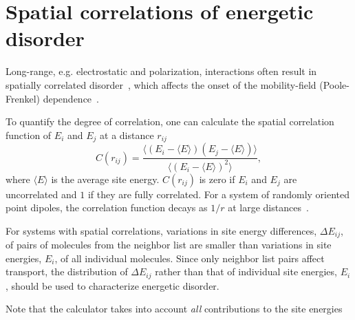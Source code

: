 \section{Spatial correlations of energetic disorder}
\label{sec:eanalyze}

Long-range, e.g. electrostatic and polarization, interactions often result in spatially correlated disorder~\cite{dunlap_charge-dipole_1996}, which affects the onset of the mobility-field (Poole-Frenkel) dependence~\cite{derrida_velocity_1983,novikov_essential_1998,nagata_atomistic_2008}.    

To quantify the degree of correlation, one can calculate the spatial correlation function of $E_i$ and $E_j$ at a distance $r_{ij}$
\begin{equation}
\label{equ:cf}
C(r_{ij}) = \frac{  \langle \left( E_i-\langle E\rangle \right)
                   \left( E_j-\langle E\rangle \right)\rangle}
                   {\langle\left( E_i -\langle E\rangle \right)^2\rangle},
\end{equation}
where $\langle E\rangle$ is the average site energy. $C(r_{ij})$ is zero if $E_i$ and $E_j$ are uncorrelated and $1$ if they are fully correlated. For a system of randomly oriented point dipoles, the correlation function decays as $1/r$ at large distances~\cite{novikov_cluster_1995}.

For systems with spatial correlations, variations in site energy differences, $\Delta E_{ij}$, of pairs of molecules from the neighbor list are smaller than variations in site energies, $E_i$, of all individual molecules. Since only neighbor list pairs affect transport, the distribution of $\Delta E_{ij}$ rather than that of individual site energies, $E_i$, should be used to characterize energetic disorder.

Note that the  calculator takes into account {\em all} contributions to the site energies 

